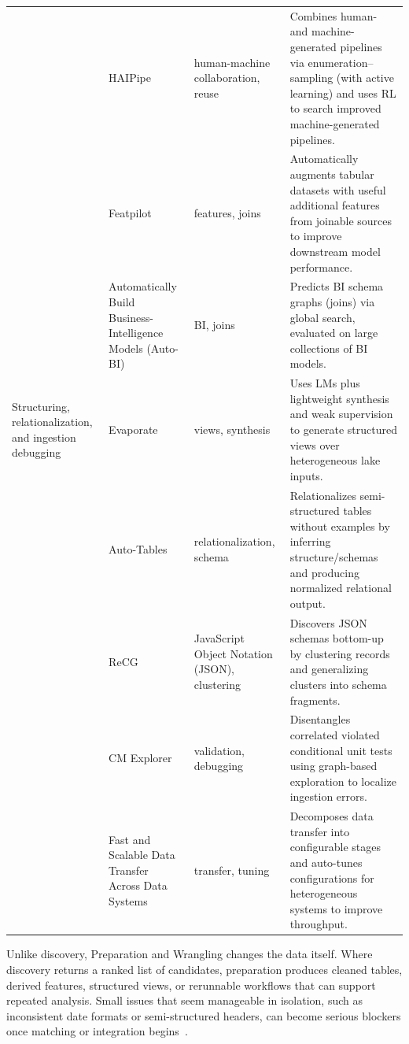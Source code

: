 \documentclass[sigconf]{acmart}
\begin{document}
\begin{table}[!htbp]
\begin{tabularx}{\textwidth}{@{}p{24mm}p{28mm}p{18mm}Y@{}}
~ &
HAIPipe~\cite{10.1145/3588945} &
human-machine collaboration, reuse &
Combines human- and machine-generated pipelines via enumeration--sampling (with active learning) and uses RL to search improved machine-generated pipelines. \\

~ &
Featpilot~\cite{11113027} &
features, joins &
Automatically augments tabular datasets with useful additional features from joinable sources to improve downstream model performance. \\

~ &
Automatically Build Business-Intelligence Models (Auto-BI)~\cite{10.14778/3603581.3603596} &
BI, joins &
Predicts BI schema graphs (joins) via global search, evaluated on large collections of BI models. \\

\midrule

Structuring, relationalization, and ingestion debugging &
Evaporate~\cite{10.14778/3626292.3626294} &
views, synthesis &
Uses LMs plus lightweight synthesis and weak supervision to generate structured views over heterogeneous lake inputs. \\

~ &
Auto-Tables~\cite{10.1145/3665252.3665269} &
relationalization, schema &
Relationalizes semi-structured tables without examples by inferring structure/schemas and producing normalized relational output. \\

~ &
ReCG~\cite{10.14778/3681954.3682019} &
JavaScript Object Notation (JSON), clustering &
Discovers JSON schemas bottom-up by clustering records and generalizing clusters into schema fragments. \\

~ &
CM Explorer~\cite{10.14778/3611540.3611595} &
validation, debugging &
Disentangles correlated violated conditional unit tests using graph-based exploration to localize ingestion errors. \\

~ &
Fast and Scalable Data Transfer Across Data Systems~\cite{10.1145/3725294} &
transfer, tuning &
Decomposes data transfer into configurable stages and auto-tunes configurations for heterogeneous systems to improve throughput. \\

\bottomrule
\end{tabularx}
\end{table}

Unlike discovery, Preparation and Wrangling changes the data itself. Where discovery returns a ranked list of candidates, preparation produces cleaned tables, derived features, structured views, or rerunnable workflows that can support repeated analysis. Small issues that seem manageable in isolation, such as inconsistent date formats or semi-structured headers, can become serious blockers once matching or integration begins~\cite{10.14778/3675034.3675051,10.14778/3611540.3611628,10.1145/3665252.3665269}.
\end{document}
